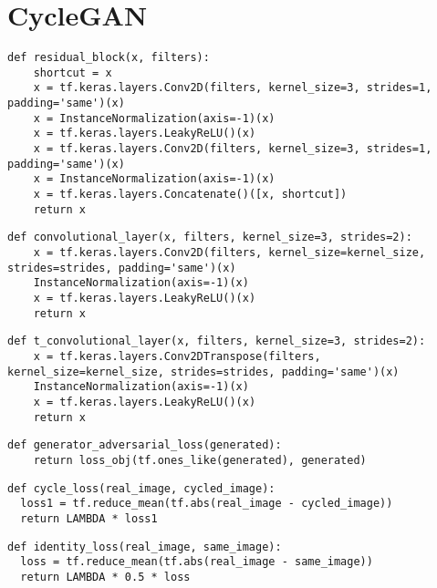 \newpage
\section*{CycleGAN}
\begin{lstlisting}[language=pyhaff, caption={Residualblock Implementierung}, label={cod:residual}]
def residual_block(x, filters):
    shortcut = x
    x = tf.keras.layers.Conv2D(filters, kernel_size=3, strides=1, padding='same')(x)
    x = InstanceNormalization(axis=-1)(x)
    x = tf.keras.layers.LeakyReLU()(x)
    x = tf.keras.layers.Conv2D(filters, kernel_size=3, strides=1, padding='same')(x)
    x = InstanceNormalization(axis=-1)(x)
    x = tf.keras.layers.Concatenate()([x, shortcut])
    return x
\end{lstlisting}

\begin{lstlisting}[language=pyhaff, caption={Convolutional Block in CycleGAN}, label={cod:cycleGANConvolutional}]
def convolutional_layer(x, filters, kernel_size=3, strides=2):
    x = tf.keras.layers.Conv2D(filters, kernel_size=kernel_size, strides=strides, padding='same')(x)
    InstanceNormalization(axis=-1)(x)
    x = tf.keras.layers.LeakyReLU()(x)
    return x
\end{lstlisting}

\newpage
\begin{lstlisting}[language=pyhaff, caption={Transpose Convolutional Block in CycleGAN}, label={cod:cycleGANTransposeConv}]
def t_convolutional_layer(x, filters, kernel_size=3, strides=2):
    x = tf.keras.layers.Conv2DTranspose(filters, kernel_size=kernel_size, strides=strides, padding='same')(x)
    InstanceNormalization(axis=-1)(x)
    x = tf.keras.layers.LeakyReLU()(x)
    return x
\end{lstlisting}

\begin{lstlisting}[language=pyhaff, caption={Adversarieller Verlust des Generators in CycleGAN}, label={cod:cycleGANadversarialLoss}]
def generator_adversarial_loss(generated):
    return loss_obj(tf.ones_like(generated), generated)
\end{lstlisting}

\begin{lstlisting}[language=pyhaff, caption={Zykluskonsistenz Verlust in CycleGAN}, label={cod:cycleLoss}]
def cycle_loss(real_image, cycled_image):
  loss1 = tf.reduce_mean(tf.abs(real_image - cycled_image))
  return LAMBDA * loss1
\end{lstlisting}
\newpage
\begin{lstlisting}[language=pyhaff, caption={Identitätsverlust in CycleGAN}, label={cod:identityLoss}]
def identity_loss(real_image, same_image):
  loss = tf.reduce_mean(tf.abs(real_image - same_image))
  return LAMBDA * 0.5 * loss
\end{lstlisting}


